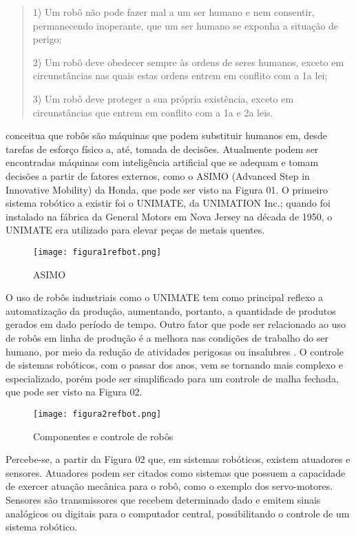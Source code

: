 \begin{quote}
1) Um robô não pode fazer mal a um ser humano e nem consentir, permanecendo inoperante, que um ser humano se exponha a situação de perigo;

2) Um robô deve obedecer sempre às ordens de seres humanos, exceto em circunstâncias nas quais estas ordens entrem em conflito com a 1a lei; 

3) Um robô deve proteger a sua própria existência, exceto em circunstâncias que entrem em conflito com a 1a e 2a leis. 
\end{quote}	

\cite{siciliano2010} conceitua que robôs são máquinas que podem substituir humanos em, desde tarefas de esforço físico a, até, tomada de decisões. Atualmente podem ser encontradas máquinas com inteligência artificial que se adequam e tomam decisões a partir de fatores externos, como o ASIMO (Advanced Step in Innovative Mobility) da Honda, que pode ser visto na Figura 01. O primeiro sistema robótico a existir foi o UNIMATE, da UNIMATION Inc.; quando foi instalado na fábrica da General Motors em Nova Jersey na década de 1950, o UNIMATE era utilizado para elevar peças de metais quentes.

\begin{figure}[h!]												
	\centering												
	\texttt{[image: figura1refbot.png]}			
	\caption{ASIMO}		
	\label{img:denavit}	
\end{figure}


O uso de robôs industriais como o UNIMATE tem como principal reflexo a automatização da produção, aumentando, portanto, a quantidade de produtos gerados em dado período de tempo. Outro fator que pode ser relacionado ao uso de robôs em linha de produção é a melhora nas condições de trabalho do ser humano, por meio da redução de atividades perigosas ou insalubres \cite{bouteille}.
O controle de sistemas robóticos, com o passar dos anos, vem se tornando mais complexo e especializado, porém pode ser simplificado para um controle de malha fechada, que pode ser visto na Figura 02.

\begin{figure}[h!]												
	\centering												
	\texttt{[image: figura2refbot.png]}			
	\caption{Componentes e controle de robôs}		
	\label{img:denavit}	
\end{figure}

Percebe-se, a partir da Figura 02 que, em sistemas robóticos, existem atuadores e sensores. Atuadores podem ser citados como sistemas que possuem a capacidade de exercer atuação mecânica para o robô, como o exemplo dos servo-motores. Sensores são transmissores que recebem determinado dado e emitem sinais analógicos ou digitais para o computador central, possibilitando o controle de um sistema robótico. 





